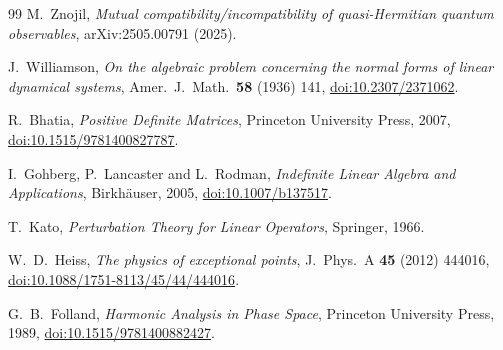 \documentclass[11pt]{article}
\theoremstyle{definition}
\theoremstyle{remark}
\begin{document}
\begin{thebibliography}{99}
M.~Znojil,
\emph{Mutual compatibility/incompatibility of quasi-Hermitian quantum
observables},
arXiv:2505.00791 (2025).

J.~Williamson,
\emph{On the algebraic problem concerning the normal forms of linear
dynamical systems},
Amer.\ J.\ Math.\ \textbf{58} (1936) 141,
\href{https://doi.org/10.2307/2371062}{doi:10.2307/2371062}.

R.~Bhatia,
\emph{Positive Definite Matrices},
Princeton University Press, 2007,
\href{https://doi.org/10.1515/9781400827787}{doi:10.1515/9781400827787}.

I.~Gohberg, P.~Lancaster and L.~Rodman,
\emph{Indefinite Linear Algebra and Applications},
Birkh\"auser, 2005,
\href{https://doi.org/10.1007/b137517}{doi:10.1007/b137517}.

T.~Kato,
\emph{Perturbation Theory for Linear Operators},
Springer, 1966.

W.~D.~Heiss,
\emph{The physics of exceptional points},
J.\ Phys.\ A \textbf{45} (2012) 444016,
\href{https://doi.org/10.1088/1751-8113/45/44/444016}{doi:10.1088/1751-8113/45/44/444016}.

G.~B.~Folland,
\emph{Harmonic Analysis in Phase Space},
Princeton University Press, 1989,
\href{https://doi.org/10.1515/9781400882427}{doi:10.1515/9781400882427}.

\end{thebibliography}
\end{document}
